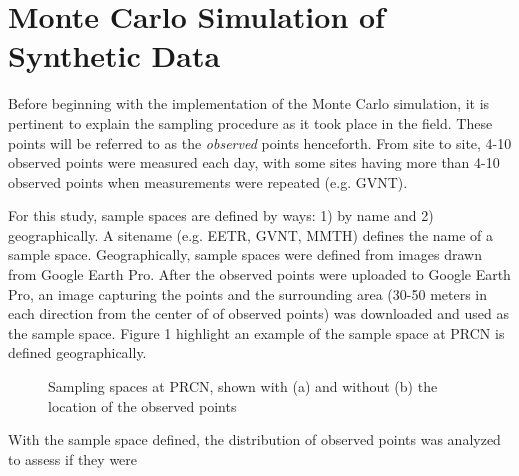 \section{Monte Carlo Simulation of Synthetic Data}

\noindent
Before beginning with the implementation of the Monte Carlo simulation, it is pertinent to explain the sampling procedure as  it took place in the field.  These points will be referred to as the \textit{observed} points henceforth.  From site to site, 4-10 observed points were measured each day, with some sites having more than 4-10 observed points when measurements were repeated (e.g. GVNT).  

\vspace{3mm} \par \noindent
For this study, sample spaces are defined by ways: 1) by name and 2) geographically.  A sitename (e.g. EETR, GVNT, MMTH) defines the name of a sample space. Geographically, sample spaces were defined from images drawn from Google Earth Pro. After the observed points were uploaded to Google Earth Pro, an image capturing the points and the surrounding area (30-50 meters in each direction from the center of of observed points) was downloaded and used as the sample space.  Figure 1 highlight an example of the sample space at PRCN is defined geographically.

\begin{figure}[h]
    \centering
    \caption{Sampling spaces at PRCN, shown with (a) and without (b) the location of the observed points}
    \label{fig:subfigures}
\end{figure}

\vspace{3mm} \par \noindent
With the sample space defined, the distribution of observed points was analyzed to assess if they were